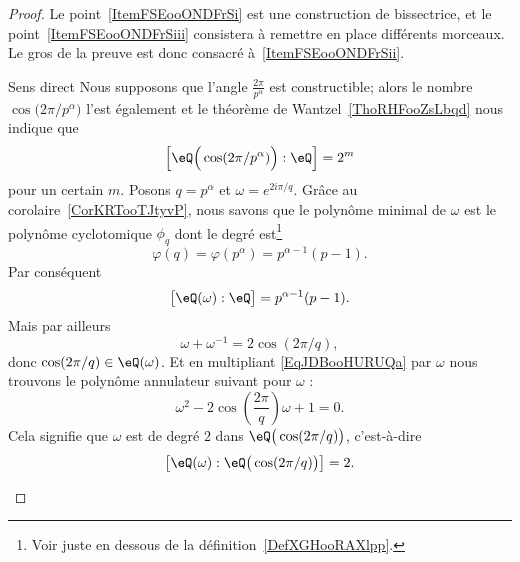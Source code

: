 \begin{proof}
    Le point~\ref{ItemFSEooONDFrSi} est une construction de bissectrice, et le point~\ref{ItemFSEooONDFrSiii} consistera à remettre en place différents morceaux. Le gros de la preuve est donc consacré à~\ref{ItemFSEooONDFrSii}.
    \begin{subproof}
        \item[Sens direct]
            Nous supposons que l'angle \( \frac{ 2\pi }{ p^{\alpha} }\) est constructible; alors le nombre \( \cos\big( 2\pi/p^{\alpha} \big)\) l'est également et le théorème de Wantzel~\ref{ThoRHFooZsLbqd} nous indique que
            \begin{equation}
                \left[ \eQ\Big( \cos(2\pi/p^{\alpha}) \Big):\eQ \right]=2^m
            \end{equation}
            pour un certain \( m\). Posons \( q=p^{\alpha}\) et \( \omega= e^{2i\pi/q}\). Grâce au corolaire~\ref{CorKRTooTJtyvP}, nous savons que le polynôme minimal de \( \omega\) est le polynôme cyclotomique \( \phi_q\) dont le
            degré est\footnote{Voir juste en dessous de la définition~\ref{DefXGHooRAXlpp}.}         %
            \begin{equation}
                \varphi(q)=\varphi(p^{\alpha})=p^{\alpha-1}(p-1).
            \end{equation}
            Par conséquent
            \begin{equation}
                \big[ \eQ(\omega):\eQ \big]=p^{\alpha-1}(p-1).
            \end{equation}
            Mais par ailleurs
            \begin{equation}    \label{EqJDBooHURUQa}
                \omega+\omega^{-1}=2\cos(2\pi/q),
            \end{equation}
            donc \( \cos(2\pi/q)\in \eQ(\omega)\). Et en multipliant \eqref{EqJDBooHURUQa} par \( \omega\) nous trouvons le polynôme annulateur suivant pour \( \omega\) :
            \begin{equation}
                \omega^2-2\cos\left( \frac{ 2\pi }{ q } \right)\omega+1=0.
            \end{equation}
            Cela signifie que \( \omega\) est de degré \( 2\) dans \( \eQ\big( \cos(2\pi/q) \big)\), c'est-à-dire
            \begin{equation}    \label{EqSJXooRCLJyt}
                \big[ \eQ(\omega):\eQ\big( \cos(2\pi/q) \big) \big]=2.
            \end{equation}

\end{subproof}
\end{proof}

